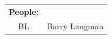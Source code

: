 \documentclass[10pt]{article}
\begin{document}
\begin{center}
{\label{tab:LABEL}
}

\vspace{1em}
\begin{tabular}{|c|c|}\hline %
{\bf People: } & \\
BL & Barry Langman \\

\end{tabular}
\end{center}
\end{document}
